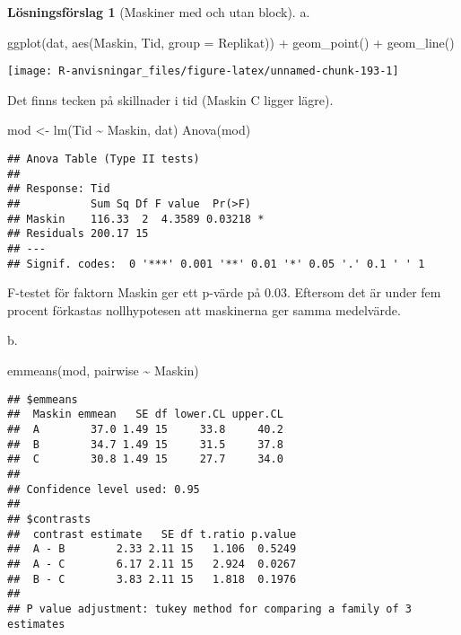 \documentclass[
]{book}
\newenvironment{Shaded}{\begin{snugshade}}{\end{snugshade}}
\newcommand{\AttributeTok}[1]{\textcolor[rgb]{0.77,0.63,0.00}{#1}}
\newcommand{\FunctionTok}[1]{\textcolor[rgb]{0.00,0.00,0.00}{#1}}
\newcommand{\NormalTok}[1]{#1}
\newcommand{\OtherTok}[1]{\textcolor[rgb]{0.56,0.35,0.01}{#1}}
\newcommand{\SpecialCharTok}[1]{\textcolor[rgb]{0.00,0.00,0.00}{#1}}
\theoremstyle{definition}
\theoremstyle{definition}
\theoremstyle{definition}
\theoremstyle{definition}
\newtheorem{hypothesis}{Lösningsförslag}[chapter]
\theoremstyle{remark}
\begin{document}
\begin{hypothesis}[Maskiner med och utan block]
a.

\begin{Shaded}
\begin{Highlighting}[]
\FunctionTok{ggplot}\NormalTok{(dat, }\FunctionTok{aes}\NormalTok{(Maskin, Tid, }\AttributeTok{group =}\NormalTok{ Replikat)) }\SpecialCharTok{+}
  \FunctionTok{geom\_point}\NormalTok{() }\SpecialCharTok{+}
  \FunctionTok{geom\_line}\NormalTok{()}
\end{Highlighting}
\end{Shaded}

\begin{center}\texttt{[image: R-anvisningar\_files/figure-latex/unnamed-chunk-193-1]} \end{center}

Det finns tecken på skillnader i tid (Maskin C ligger lägre).

\begin{Shaded}
\begin{Highlighting}[]
\NormalTok{mod }\OtherTok{\textless{}{-}} \FunctionTok{lm}\NormalTok{(Tid }\SpecialCharTok{\textasciitilde{}}\NormalTok{ Maskin, dat)}
\FunctionTok{Anova}\NormalTok{(mod)}
\end{Highlighting}
\end{Shaded}

\begin{verbatim}
## Anova Table (Type II tests)
## 
## Response: Tid
##           Sum Sq Df F value  Pr(>F)  
## Maskin    116.33  2  4.3589 0.03218 *
## Residuals 200.17 15                  
## ---
## Signif. codes:  0 '***' 0.001 '**' 0.01 '*' 0.05 '.' 0.1 ' ' 1
\end{verbatim}

F-testet för faktorn Maskin ger ett p-värde på 0.03. Eftersom det är under fem procent förkastas nollhypotesen att maskinerna ger samma medelvärde.

b.

\begin{Shaded}
\begin{Highlighting}[]
\FunctionTok{emmeans}\NormalTok{(mod, pairwise }\SpecialCharTok{\textasciitilde{}}\NormalTok{ Maskin)}
\end{Highlighting}
\end{Shaded}

\begin{verbatim}
## $emmeans
##  Maskin emmean   SE df lower.CL upper.CL
##  A        37.0 1.49 15     33.8     40.2
##  B        34.7 1.49 15     31.5     37.8
##  C        30.8 1.49 15     27.7     34.0
## 
## Confidence level used: 0.95 
## 
## $contrasts
##  contrast estimate   SE df t.ratio p.value
##  A - B        2.33 2.11 15   1.106  0.5249
##  A - C        6.17 2.11 15   2.924  0.0267
##  B - C        3.83 2.11 15   1.818  0.1976
## 
## P value adjustment: tukey method for comparing a family of 3 estimates
\end{verbatim}


\end{hypothesis}
\end{document}
